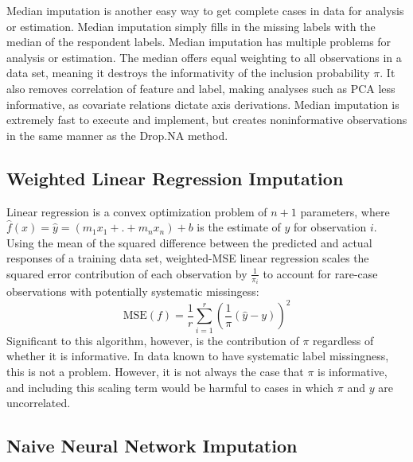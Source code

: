 \documentclass[12pt,twoside]{reedthesis}
\begin{document}
Median imputation is another easy way to get complete cases in data for
analysis or estimation. Median imputation simply fills in the missing
labels with the median of the respondent labels. Median imputation has
multiple problems for analysis or estimation. The median offers equal
weighting to all observations in a data set, meaning it destroys the
informativity of the inclusion probability \(\pi\). It also removes
correlation of feature and label, making analyses such as PCA less
informative, as covariate relations dictate axis derivations. Median
imputation is extremely fast to execute and implement, but creates
noninformative observations in the same manner as the Drop.NA method.

\subsection{Weighted Linear Regression
Imputation}\label{weighted-linear-regression-imputation}

Linear regression is a convex optimization problem of \(n+1\)
parameters, where \(\hat f(x) = \hat y = (m_1x_1 + .+ m_nx_n)+b\) is the
estimate of \(y\) for observation \(i\). Using the mean of the squared
difference between the predicted and actual responses of a training data
set, weighted-MSE linear regression scales the squared error
contribution of each observation by \(\frac{1}{\pi_i}\) to account for
rare-case observations with potentially systematic missingess: \[
\text{MSE}(f) = \frac{1}{r} \sum_{i=1}^r  (\frac{1}{\pi}(\hat{y} - y))^2
\] Significant to this algorithm, however, is the contribution of
\(\pi\) regardless of whether it is informative. In data known to have
systematic label missingness, this is not a problem. However, it is not
always the case that \(\pi\) is informative, and including this scaling
term would be harmful to cases in which \(\pi\) and \(y\) are
uncorrelated.

\subsection{Naive Neural Network
Imputation}\label{naive-neural-network-imputation}
\end{document}
